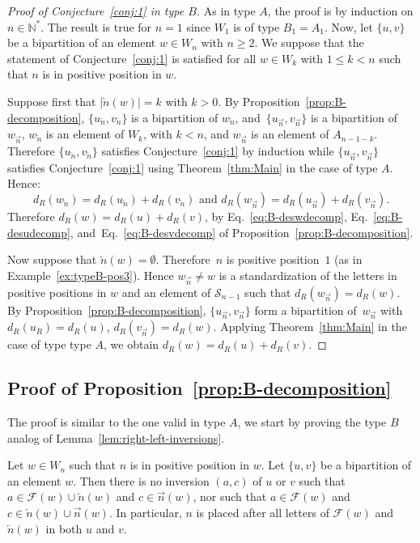 \documentclass[Unicode]{cedram-alco}
\theoremstyle{definition}
\newcommand{\R}{{\overrightarrow{n}}}
\newcommand{\LL}{{\overleftarrow{n}}}
\newcommand{\dd}{d_R}
\newcommand{\F}{\mathcal{F}}
\begin{document}
\begin{proof}[Proof of Conjecture~\ref{conj:1} in type $B$] As in type $A$, the proof is  by induction on $n\in \mathbb N^*$. The result is true for $n=1$ since  $W_1$ is of type $B_1=A_1$. Now, let $\lbrace u, v \rbrace$ be a bipartition of an element $w \in W_n$ with $n \geq 2$. We suppose that the statement of Conjecture~\ref{conj:1} is satisfied for all $w\in W_k$ with $1 \leq k < n$ such that $n$ is in positive position in $w$. 

Suppose first that $|\LL(w)|=k$ with $k > 0$. By Proposition~\ref{prop:B-decomposition}, $\lbrace u_\LL, v_\LL \rbrace$ is a bipartition of $w_\LL$, and~$\lbrace u_\R, v_\R \rbrace$ is a bipartition of $w_\R$,  $w_\LL$ is an element of $W_k$, with $k < n$, and $w_\R$ is an element of $A_{n-1-k}$. Therefore $\lbrace u_\LL, v_\LL \rbrace$ satisfies Conjecture~\ref{conj:1} by induction while $\lbrace u_\R, v_\R \rbrace$ satisfies Conjecture~\ref{conj:1} using Theorem~\ref{thm:Main} in the case of type $A$. Hence: 
$$
\dd(w_\LL) = \dd(u_\LL) + \dd(v_\LL)\textrm{ and }\dd(w_\R) = \dd(u_\R) + \dd(v_\R).
$$ 
Therefore $\dd(w) = \dd(u) + \dd(v)$, by Eq.~\eqref{eq:B-deswdecomp}, Eq.~\eqref{eq:B-desudecomp}, and~Eq.~\eqref{eq:B-desvdecomp} of Proposition~\ref{prop:B-decomposition}.

Now suppose that $\LL(w)=\emptyset$. Therefore~$n$ is positive position~$1$ (as in Example~\ref{ex:typeB-pos3}). Hence $w_\R\not =w$ is a standardization of the letters in positive positions in $w$ and an element of $\mathcal S_{n-1}$ such that $\dd(w_\R) = \dd(w)$. By Proposition~\ref{prop:B-decomposition}, $\lbrace u_\R, v_\R \rbrace$ form a bipartition of~$w_\R$ with $\dd(u_R) = \dd(u)$, $\dd(v_\R) = \dd(w)$. Applying Theorem~\ref{thm:Main} in  the case of type type $A$, we obtain $\dd(w) = \dd(u) + \dd(v)$. 
\end{proof}


\subsection{Proof of Proposition~\ref{prop:B-decomposition}}

The proof is  similar to the one valid in type $A$, we start by proving the type $B$ analog of Lemma~\ref{lem:right-left-inversions}.

\begin{lemm}
\label{lem:B-right-left-inversions}
Let $w\in W_n$ such that $n$ is in positive position in $w$. Let $\lbrace u, v \rbrace$ be a bipartition of an element $w$. Then there is no inversion $(a,c)$ of $u$ or $v$ such that $a \in \F(w) \cup \LL(w)$ and $c \in \R(w)$, nor such that $a\in \F(w)$ and $c \in \LL(w) \cup \R(w)$. In particular, $n$ is placed after all letters of $\F(w)$ and $\LL(w)$ in both $u$ and $v$.
\end{lemm} 
\end{document}
